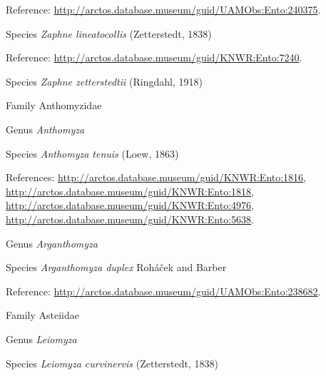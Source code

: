 \documentclass[9pt, article]{memoir}
\begin{document}
\begin{multicols}{2}
\vspace{6pt}Reference: 
\url{http://arctos.database.museum/guid/UAMObs:Ento:240375}.

\vspace{6pt}\noindent\hspace{36pt}Species \textit{Zaphne lineatocollis} (Zetterstedt, 1838)


\vspace{6pt}Reference: 
\url{http://arctos.database.museum/guid/KNWR:Ento:7240}.

\vspace{6pt}\noindent\hspace{36pt}Species \textit{Zaphne zetterstedtii} (Ringdahl, 1918)


\vspace{6pt}\noindent\hspace{24pt}Family Anthomyzidae


\vspace{6pt}\noindent\hspace{30pt}Genus \textit{Anthomyza}


\vspace{6pt}\noindent\hspace{36pt}Species \textit{Anthomyza tenuis} (Loew, 1863)


\vspace{6pt}References: 
\url{http://arctos.database.museum/guid/KNWR:Ento:1816}, 
\url{http://arctos.database.museum/guid/KNWR:Ento:1818}, 
\url{http://arctos.database.museum/guid/KNWR:Ento:4976}, 
\url{http://arctos.database.museum/guid/KNWR:Ento:5638}.

\vspace{6pt}\noindent\hspace{30pt}Genus \textit{Arganthomyza}


\vspace{6pt}\noindent\hspace{36pt}Species \textit{Arganthomyza duplex} Roháček and Barber


\vspace{6pt}Reference: 
\url{http://arctos.database.museum/guid/UAMObs:Ento:238682}.

\vspace{6pt}\noindent\hspace{24pt}Family Asteiidae


\vspace{6pt}\noindent\hspace{30pt}Genus \textit{Leiomyza}


\vspace{6pt}\noindent\hspace{36pt}Species \textit{Leiomyza curvinervis} (Zetterstedt, 1838)



\end{multicols}
\end{document}
